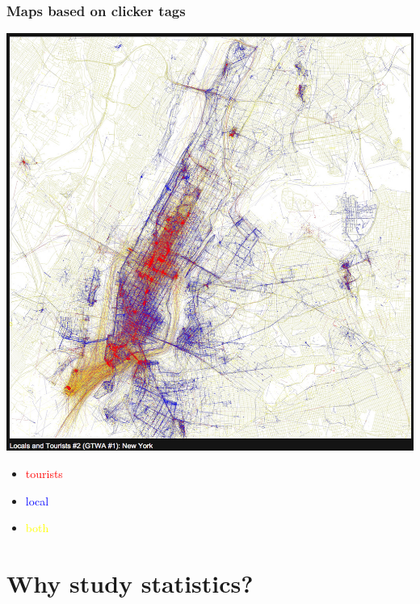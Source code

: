 \documentclass[slidestop,compress,mathserif,12pt,t,professionalfonts,xcolor=table]{beamer}
\begin{document}
\begin{frame}
\frametitle{Maps based on clicker tags}

{
\begin{center}
\includegraphics[width=\textwidth]{figures/flickr_ny}
\end{center}
}
{
\begin{itemize}
\item[] \textcolor{red}{tourists}
\item[] \textcolor{blue}{local}
\item[] \textcolor{yellow}{both}
\end{itemize}
}


\end{frame}


\section{Why study statistics?}

\end{document}
